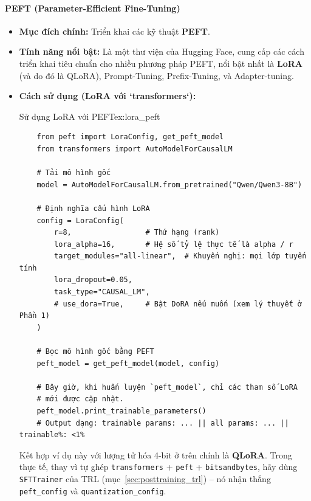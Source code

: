 \paragraph{PEFT (Parameter-Efficient Fine-Tuning)}
\begin{itemize}
    \item \textbf{Mục đích chính:} Triển khai các kỹ thuật \textbf{PEFT}.
    \item \textbf{Tính năng nổi bật:} Là một thư viện của Hugging Face, cung cấp các cách triển khai tiêu chuẩn cho nhiều phương pháp PEFT, nổi bật nhất là \textbf{LoRA} (và do đó là QLoRA), Prompt-Tuning, Prefix-Tuning, và Adapter-tuning.
    \item \textbf{Cách sử dụng (LoRA với `transformers`):}
    \begin{example}{Sử dụng LoRA với PEFT}{ex:lora_peft}
    \begin{verbatim}
    from peft import LoraConfig, get_peft_model
    from transformers import AutoModelForCausalLM

    # Tải mô hình gốc
    model = AutoModelForCausalLM.from_pretrained("Qwen/Qwen3-8B")

    # Định nghĩa cấu hình LoRA
    config = LoraConfig(
        r=8,                 # Thứ hạng (rank)
        lora_alpha=16,       # Hệ số tỷ lệ thực tế là alpha / r
        target_modules="all-linear",  # Khuyến nghị: mọi lớp tuyến tính
        lora_dropout=0.05,
        task_type="CAUSAL_LM",
        # use_dora=True,     # Bật DoRA nếu muốn (xem lý thuyết ở Phần 1)
    )

    # Bọc mô hình gốc bằng PEFT
    peft_model = get_peft_model(model, config)

    # Bây giờ, khi huấn luyện `peft_model`, chỉ các tham số LoRA
    # mới được cập nhật.
    peft_model.print_trainable_parameters()
    # Output dạng: trainable params: ... || all params: ... || trainable%: <1%
    \end{verbatim}
    \end{example}
    Kết hợp ví dụ này với lượng tử hóa 4-bit ở trên chính là \textbf{QLoRA}. Trong thực tế, thay vì tự ghép \texttt{transformers} + \texttt{peft} + \texttt{bitsandbytes}, hãy dùng \texttt{SFTTrainer} của TRL (mục~\ref{sec:posttraining_trl}) -- nó nhận thẳng \texttt{peft\_config} và \texttt{quantization\_config}.
\end{itemize}

